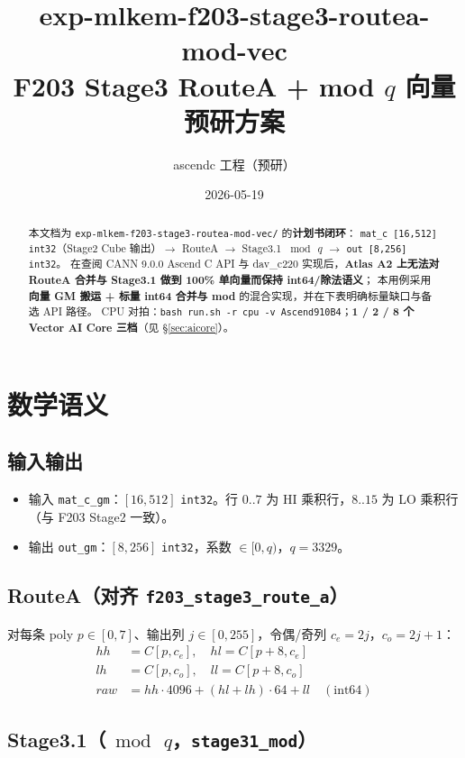 \documentclass[UTF8,a4paper,11pt]{ctexart}
\title{exp-mlkem-f203-stage3-routea-mod-vec\\F203 Stage3 RouteA + mod $q$ 向量预研方案}
\author{ascendc 工程（预研）}
\date{2026-05-19}
\begin{document}
\maketitle

\begin{abstract}
本文档为 \texttt{exp-mlkem-f203-stage3-routea-mod-vec/} 的\textbf{计划书闭环}：
\texttt{mat\_c [16,512] int32}（Stage2 Cube 输出）$\rightarrow$ RouteA $\rightarrow$ Stage3.1 $\bmod\,q$ $\rightarrow$ \texttt{out [8,256] int32}。
在查阅 CANN 9.0.0 Ascend C API 与 dav\_c220 实现后，\textbf{Atlas A2 上无法对 RouteA 合并与 Stage3.1 做到 100\% 单向量而保持 int64/除法语义}；
本用例采用\textbf{向量 GM 搬运 + 标量 int64 合并与 mod} 的混合实现，并在下表明确标量缺口与备选 API 路径。
CPU 对拍：\texttt{bash run.sh -r cpu -v Ascend910B4}；\textbf{1 / 2 / 8 个 Vector AI Core 三档}（见 §\ref{sec:aicore}）。
\end{abstract}

\tableofcontents
\newpage

\section{数学语义}

\subsection{输入输出}
\begin{itemize}
  \item 输入 \texttt{mat\_c\_gm}：$[16,512]$ \texttt{int32}。行 $0..7$ 为 HI 乘积行，$8..15$ 为 LO 乘积行（与 F203 Stage2 一致）。
  \item 输出 \texttt{out\_gm}：$[8,256]$ \texttt{int32}，系数 $\in [0,q)$，$q=3329$。
\end{itemize}

\subsection{RouteA（对齐 \texttt{f203\_stage3\_route\_a}）}
对每条 poly $p\in[0,7]$、输出列 $j\in[0,255]$，令偶/奇列 $c_e=2j$，$c_o=2j+1$：
\begin{align}
  hh &= C[p, c_e], \quad hl = C[p+8, c_e] \\
  lh &= C[p, c_o], \quad ll = C[p+8, c_o] \\
  raw &= hh\cdot 4096 + (hl+lh)\cdot 64 + ll \quad (\text{int64})
\end{align}

\subsection{Stage3.1（$\bmod\,q$，\texttt{stage31\_mod}）}
\end{document}
